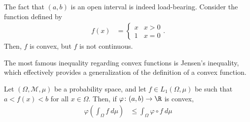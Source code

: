 \documentclass[10pt]{mypackage}
\begin{document}
\begin{remark}
  The fact that $\left( a,b \right)$ is an open interval is indeed load-bearing. Consider the function defined by
  \begin{align*}
    f\left( x \right) &= \begin{cases}
      x & x > 0\\
      1 & x = 0
    \end{cases}.
  \end{align*}
  Then, $f$ is convex, but $f$ is not continuous.
\end{remark}
The most famous inequality regarding convex functions is Jensen's inequality, which effectively provides a generalization of the definition of a convex function.
\begin{theorem}
  Let $\left( \Omega,\mathcal{M},\mu \right)$ be a probability space, and let $f\in L_1\left( \Omega,\mu \right)$ be such that $a < f(x) < b$ for all $x\in \Omega$. Then, if $\varphi\colon (a,b)\rightarrow \R$ is convex,
  \begin{align*}
    \varphi\left( \int_{\Omega}^{} f\:d\mu \right) &\leq \int_{\Omega}^{} \varphi\circ f\:d\mu
  \end{align*}
\end{theorem}
\end{document}
